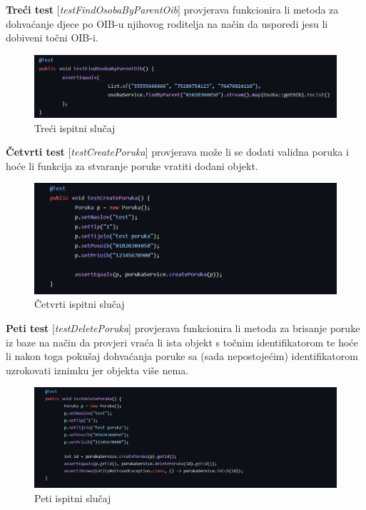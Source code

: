 			\noindent \textbf{Treći test} [\textit{testFindOsobaByParentOib}] provjerava funkcionira li metoda za dohvaćanje djece po OIB-u njihovog roditelja na način da usporedi jesu li dobiveni točni OIB-i.
			\begin{figure}[H]
				\includegraphics[width=\textwidth]{slike/junit_3.png}
				\caption{Treći ispitni slučaj}
				\label{fig:junit_3}
			\end{figure}
			
			\noindent \textbf{Četvrti test} [\textit{testCreatePoruka}] provjerava može li se dodati validna poruka i hoće li funkcija za stvaranje poruke vratiti dodani objekt.
			\begin{figure}[H]
				\includegraphics[width=\textwidth]{slike/junit_4.png}
				\caption{Četvrti ispitni slučaj}
				\label{fig:junit_4}
			\end{figure}
			
		 	\noindent \textbf{Peti test} [\textit{testDeletePoruka}] provjerava funkcionira li metoda za brisanje poruke iz baze na način da provjeri vraća li ista objekt s točnim identifikatorom te hoće li nakon toga pokušaj dohvaćanja poruke sa (sada nepostojećim) identifikatorom uzrokovati iznimku jer objekta više nema.
		 	\begin{figure}[H]
		 		\includegraphics[width=\textwidth]{slike/junit_5.png}
		 		\caption{Peti ispitni slučaj}
		 		\label{fig:junit_5}
		 	\end{figure}
		 	
